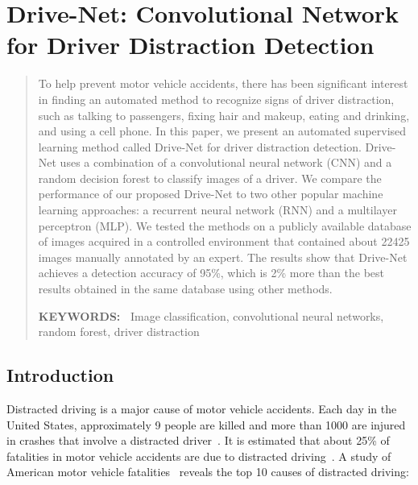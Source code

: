 \chapter{Drive-Net: Convolutional Network for Driver Distraction Detection}

\begin{abstract}
To help prevent motor vehicle accidents, there has been significant interest in finding an automated method to recognize signs of driver distraction, such as talking to passengers, fixing hair and makeup, eating and drinking, and using a cell phone. In this paper, we present an automated supervised learning method called Drive-Net for driver distraction detection. Drive-Net uses a combination of a convolutional neural network (CNN) and a random decision forest to classify images of a driver. We compare the performance of our proposed Drive-Net to two other popular machine learning approaches: a recurrent neural network (RNN) and a multilayer perceptron (MLP). We tested the methods on a publicly available database of images acquired in a controlled environment that contained about 22425 images manually annotated by an expert. The results show that Drive-Net achieves a detection accuracy of 95\%, which is 2\% more than the best results obtained in the same database using other methods.

\textbf{KEYWORDS:\ } Image classification, convolutional neural networks, random forest, driver distraction
\end{abstract}

\section{Introduction}
Distracted driving is a major cause of motor vehicle accidents. Each day in the United States, approximately 9 people are killed and more than 1000 are injured in crashes that involve a distracted driver~\cite{schroeder_National_2018}. It is estimated that about 25\% of fatalities in motor vehicle accidents are due to distracted driving~\cite{website_insurer_2013}. A study of American motor vehicle fatalities~\cite{schroeder_National_2018} reveals the top 10 causes of distracted driving:

